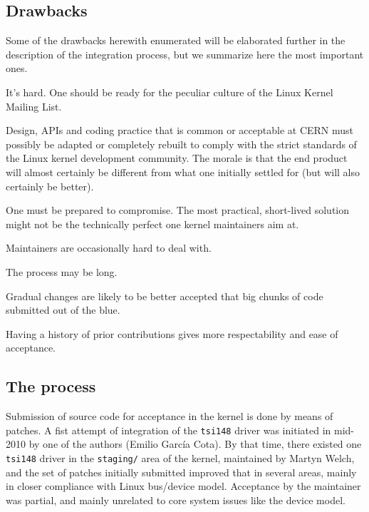 \documentclass{JAC2003}
\begin{document}
\subsection{Drawbacks}

Some of the drawbacks herewith enumerated will be elaborated further in
the description of the integration process, but we summarize here the
most important ones.

\begin{Itemize}
\item It's hard. One should be ready for the peculiar culture of the
    Linux Kernel Mailing List.
\item Design, APIs and coding practice that is common or acceptable at
    CERN must possibly be adapted or completely rebuilt to comply with the
    strict standards of the Linux kernel development community. The morale
    is that the end product will almost certainly be different from what one
    initially settled for (but will also certainly be better).
\item One must be prepared to compromise. The most practical,
    short-lived solution might not be the technically perfect one kernel
    maintainers aim at.
\item Maintainers are occasionally hard to deal with.
\item The process may be long.
\item Gradual changes are likely to be better accepted that big chunks
    of code submitted out of the blue.
\item Having a history of prior contributions gives more respectability
    and ease of acceptance.
\end{Itemize}

\subsection{The process}

Submission of source code for acceptance in the kernel is done by means
of patches. A fist attempt of integration of the \verb|tsi148| driver
was initiated in mid-2010 by one of the authors (Emilio Garc\'ia
Cota). By that time, there existed one \verb|tsi148| driver in the
\texttt{staging/} area of the kernel, maintained by Martyn Welch,
and the set of patches
initially submitted improved that in several areas, mainly in closer
compliance with Linux bus/device model. Acceptance by the
maintainer was partial, and mainly unrelated to core system
issues like the device model.
\end{document}
